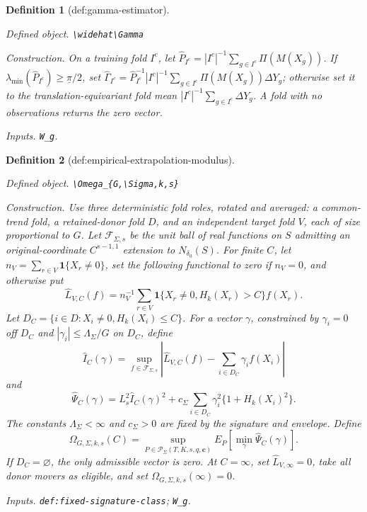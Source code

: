 \documentclass{article}
\newtheorem{definition}{Definition}
\begin{document}
\begin{definition}[def:gamma-estimator]\label{def:gamma-estimator}
\par\smallskip\noindent\emph{Defined object.} \texttt{\textbackslash{}\allowbreak{}widehat\textbackslash{}\allowbreak{}Gamma}
\par\smallskip\noindent\emph{Construction.} On a training fold \(I^c\), let \(\widehat P_{I^c}=|I^c|^{-1}\sum_{g\in I^c}\Pi(M(X_g))\). If \(\lambda_{\min}(\widehat P_{I^c})\ge\underline\pi/2\), set \(\widehat\Gamma_{I^c}=\widehat P_{I^c}^{-1}|I^c|^{-1}\sum_{g\in I^c}\Pi(M(X_g))\Delta Y_g\); otherwise set it to the translation-equivariant fold mean \(|I^c|^{-1}\sum_{g\in I^c}\Delta Y_g\). A fold with no observations returns the zero vector.
\par\smallskip\noindent\emph{Inputs.} \texttt{W\_\allowbreak{}g}.
\end{definition}

\begin{definition}[def:empirical-extrapolation-modulus]\label{def:empirical-extrapolation-modulus}
\par\smallskip\noindent\emph{Defined object.} \texttt{\textbackslash{}\allowbreak{}Omega\_\allowbreak{}\{G,\allowbreak{}\textbackslash{}\allowbreak{}Sigma,\allowbreak{}k,\allowbreak{}s\}\allowbreak{}}
\par\smallskip\noindent\emph{Construction.} Use three deterministic fold roles, rotated and averaged: a common-trend fold, a retained-donor fold \(D\), and an independent target fold \(V\), each of size proportional to \(G\). Let \(\mathcal F_{\Sigma,s}\) be the unit ball of real functions on \(S\) admitting an original-coordinate \(C^{s-1,1}\) extension to \(N_{\delta_0}(S)\). For finite \(C\), let \(n_V=\sum_{r\in V}\mathbf 1\{X_r\ne0\}\), set the following functional to zero if \(n_V=0\), and otherwise put \[\widehat L_{V,C}(f)=n_V^{-1}\sum_{r\in V}\mathbf 1\{X_r\ne0,H_k(X_r)>C\}f(X_r).\] Let \(D_C=\{i\in D:X_i\ne0,H_k(X_i)\le C\}\). For a vector \(\gamma\), constrained by \(\gamma_i=0\) off \(D_C\) and \(|\gamma_i|\le\Lambda_\Sigma/G\) on \(D_C\), define \[\widehat I_C(\gamma)=\sup_{f\in\mathcal F_{\Sigma,s}}\left|\widehat L_{V,C}(f)-\sum_{i\in D_C}\gamma_i f(X_i)\right|\] and \[\widehat\Psi_C(\gamma)=L_s^2\widehat I_C(\gamma)^2+c_\Sigma\sum_{i\in D_C}\gamma_i^2\{1+H_k(X_i)^2\}.\] The constants \(\Lambda_\Sigma<\infty\) and \(c_\Sigma>0\) are fixed by the signature and envelope. Define \[\Omega_{G,\Sigma,k,s}(C)=\sup_{P\in\mathcal P_\Sigma(T,K,s,q,\mathbf c)}E_P\!\left[\min_{\gamma}\widehat\Psi_C(\gamma)\right].\] If \(D_C=\varnothing\), the only admissible vector is zero. At \(C=\infty\), set \(\widehat L_{V,\infty}=0\), take all donor movers as eligible, and set \(\Omega_{G,\Sigma,k,s}(\infty)=0\).
\par\smallskip\noindent\emph{Inputs.} \texttt{def:\allowbreak{}fixed-\allowbreak{}signature-\allowbreak{}class}; \texttt{W\_\allowbreak{}g}.
\end{definition}
\end{document}
